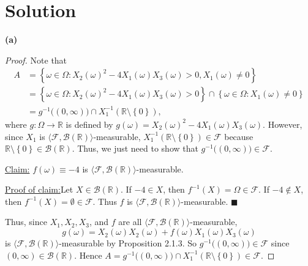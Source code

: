 \documentclass[12pt]{article}
\newenvironment{claimproof}[1]{\par\noindent\underline{Proof of claim:}\space#1}{\hfill $\blacksquare$}
\begin{document}
\section*{Solution}
{\bf (a)}
\begin{proof}
Note that 
\begin{align*}
A & = \left\{ \omega \in \Omega : X_{2}(\omega)^{2} - 4X_{1}(\omega)X_{3}(\omega) > 0, X_{1}(\omega) \neq 0 \right\} \\
& = \left\{ \omega \in \Omega : X_{2}(\omega)^{2} - 4X_{1}(\omega)X_{3}(\omega) > 0 \right\} \cap \left\{ \omega \in \Omega : X_{1}(\omega) \neq 0
\right\} \\
& = g^{-1}\bigg(\left( 0, \infty \right)\bigg) \cap X_{1}^{-1}(\mathbb{R}\setminus \left\{ 0 \right\}),
\end{align*}
where $g : \Omega \rightarrow\mathbb{R}$ is defined by $g(\omega) = X_{2}(\omega)^{2} - 4X_{1}(\omega)X_{3}(\omega)$. However, since $X_{1}$ is $\langle\mathcal{F}, \mathcal{B}(\mathbb{R})\rangle$-measurable,
$X_{1}^{-1}(\mathbb{R}\setminus \left\{ 0 \right\}) \in \mathcal{F}$ because $\mathbb{R}\setminus \left\{ 0 \right\} \in \mathcal{B}(\mathbb{R})$.
Thus, we just need to show that $g^{-1}\bigg( (0,\infty) \bigg) \in \mathcal{F}$.

\underline{Claim:} $f(\omega) \equiv -4$ is $\langle\mathcal{F}, \mathcal{B}(\mathbb{R})\rangle$-measurable.

\begin{claimproof}
Let $X \in \mathcal{B}(\mathbb{R})$. If $-4 \in X$, then $f^{-1}(X) = \Omega \in \mathcal{F}$. If $-4 \notin X$, then $f^{-1}(X) = \emptyset \in
\mathcal{F}$. Thus $f$ is $\langle\mathcal{F}, \mathcal{B}(\mathbb{R})\rangle$-measurable.
\end{claimproof}

Thus, since $X_{1}, X_{2}, X_{3}$, and $f$ are all $\langle\mathcal{F}, \mathcal{B}(\mathbb{R})\rangle$-measurable, 
\[ g(\omega) = X_{2}(\omega)X_{2}(\omega) + f(\omega)X_{1}(\omega)X_{3}(\omega) \]
is $\langle\mathcal{F}, \mathcal{B}(\mathbb{R})\rangle$-measurable by Proposition 2.1.3. So $g^{-1}\bigg( (0, \infty) \bigg) \in \mathcal{F}$ since
$(0, \infty) \in \mathcal{B}(\mathbb{R})$. Hence $A = g^{-1}\bigg( (0,\infty) \bigg) \cap X_{1}^{-1}(\mathbb{R}\setminus \left\{ 0 \right\}) \in
\mathcal{F}$.
\end{proof}
\end{document}
